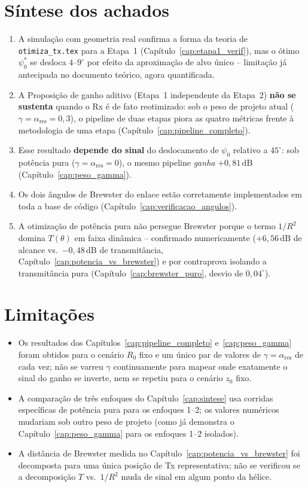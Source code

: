 \documentclass[12pt,a4paper,oneside]{book}
\theoremstyle{definition}
\theoremstyle{remark}
\begin{document}
\section{Síntese dos achados}

\begin{enumerate}
  \item A simulação com geometria real confirma a forma da teoria de
  \texttt{otimiza\_tx.tex} para a Etapa~1 (Capítulo~\ref{cap:etapa1_verif}),
  mas o ótimo $\psi_0^*$ se desloca $4$--$9^\circ$ por efeito da
  aproximação de alvo único -- limitação já antecipada no documento
  teórico, agora quantificada.
  \item A Proposição de ganho aditivo (Etapa~1 independente da Etapa~2)
  \textbf{não se sustenta} quando o Rx é de fato reotimizado: sob o peso
  de projeto atual ($\gamma=\alpha_{\mathrm{res}}=0{,}3$), o pipeline de
  duas etapas piora as quatro métricas frente à metodologia de uma etapa
  (Capítulo~\ref{cap:pipeline_completo}).
  \item Esse resultado \textbf{depende do sinal} do deslocamento de
  $\psi_0$ relativo a $45^\circ$: sob potência pura
  ($\gamma=\alpha_{\mathrm{res}}=0$), o mesmo pipeline \emph{ganha}
  $+0{,}81\,\mathrm{dB}$ (Capítulo~\ref{cap:peso_gamma}).
  \item Os dois ângulos de Brewster do enlace estão corretamente
  implementados em toda a base de código (Capítulo~\ref{cap:verificacao_angulos}).
  \item A otimização de potência pura não persegue Brewster porque o termo
  $1/R^2$ domina $T(\theta)$ em faixa dinâmica -- confirmado numericamente
  ($+6{,}56\,\mathrm{dB}$ de alcance vs.\ $-0{,}48\,\mathrm{dB}$ de
  transmitância, Capítulo~\ref{cap:potencia_vs_brewster}) e por
  contraprova isolando a transmitância pura
  (Capítulo~\ref{cap:brewster_puro}, desvio de $0{,}04^\circ$).
\end{enumerate}

\section{Limitações}

\begin{itemize}
  \item Os resultados dos Capítulos~\ref{cap:pipeline_completo}
  e~\ref{cap:peso_gamma} foram obtidos para o cenário $R_0$ fixo e um
  único par de valores de $\gamma=\alpha_{\mathrm{res}}$ de cada vez; não
  se varreu $\gamma$ continuamente para mapear onde exatamente o sinal do
  ganho se inverte, nem se repetiu para o cenário $z_0$ fixo.
  \item A comparação de três enfoques do Capítulo~\ref{cap:sintese} usa
  corridas específicas de potência pura para os enfoques 1--2; os valores
  numéricos mudariam sob outro peso de projeto (como já demonstra o
  Capítulo~\ref{cap:peso_gamma} para os enfoques 1--2 isolados).
  \item A distância de Brewster medida no Capítulo~\ref{cap:potencia_vs_brewster}
  foi decomposta para uma única posição de Tx representativa; não se
  verificou se a decomposição $T$ vs.\ $1/R^2$ muda de sinal em algum
  ponto da hélice.
\end{itemize}
\end{document}

